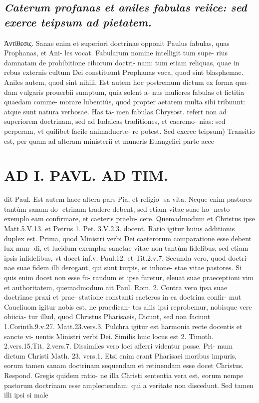 \documentclass{article}
\begin{document}
\begin{pages}
\subsection*{\textit{Caterum profanas et aniles fabulas reiice: sed exerce teipsum ad pietatem. }}\pstart Ἀντίθεσις. Sanae enim et superiori doctrinae opponit Paulus fabulas, quas Prophanas, et Ani- les vocat. Fabularum nomine intelligit tum supe- rius damnatam de prohibitione ciborum doctri- nam: tum etiam reliquas, quae in rebus externis cultum Dei constituunt Prophanas voca, quod sint blasphemae. Aniles autem, quod sint nihili. Est autem hoc postremum dictum ex forma qua- dam vulgaris prouerbii sumptum, quia solent a- nus mulieres fabulas et fictitia quaedam comme- morare lubentiùs, quod propter aetatem multa sibi tribuunt: atque sunt natura verbosae. Has ta- men fabulas Chrysost. refert non ad superiorem doctrinam, sed ad Iudaicas traditiones, et caeremo- nias: sed perperam, vt quilibet facile animaduerte- re potest.  \pend\pstart Sed exerce teipsum) Transitio est, per quam ad alteram ministerii et muneris Euangelici parte acce  \pend
\section*{AD I. PAVL. AD TIM. }
\marginpar{[ p.204 ]}\pstart dit Paul. Est autem haec altera pars Pia, et religio- sa vita. Neque enim pastores tantùm sanam do- ctrinam tradere debent, sed etiam vitae suae ho- nesto exemplo eam confirmare, et caeteris praelu- cere. Quemadmodum et Christus ipse Matt.5.V.13. et Petrus 1. Pet. 3.V.2.3. docent. Ratio igitur huius additionis duplex est. Prima, quod Ministri verbi Dei caeterorum comparatione esse debent lux mun- di, et lucidum exemplar sanctae vitae non tantùm fidelibus, sed etiam ipsis infidelibus, vt docet inf.v. Paul.12. et Tit.2.v.7. Secunda vero, quod doctri- nae suae fidem illi derogant, qui sunt turpis, et inhone- stae vitae pastores. Si quis enim docet non esse fu- randum et ipse furetur, eleuat suae praeceptioni vim et authoritatem, quemadmodum ait Paul. Rom. 2. Contra vero ipsa suae doctrinae praxi et prae- statione constanti caeteros in ea doctrina confir- mut Caueliuom igitur nobis est, ne praedican- tes aliis ipsi reprobemur, nobisque vere obiicia- tur illud, quod Christus Pharisaeis, Dicunt, sed non faciunt 1.Corinth.9.v.27. Matt.23.vers.3. Pulchra igitur est harmonia recte docentis et sancte vi- uentis Ministri verbi Dei.  \pend\pstart Similis huic locus est 2. Timoth. 2.vers.15.Tit. 2.vers.7.  \pend\pstart Dissimiles vero loci afferri videntur posse. Pri- mum dictum Christi Math. 23. vers.1. Etsi enim erant Pharisaei moribus impuris, eorum tamen sanam doctrinam sequendam et retinendam esse docet Christus. Respond. Gregis quidem ratio- ne illa Christi sententia vera est, eorum nempe pastorum doctrinam esse amplectendam: qui a veritate non discedunt. Sed tamen illi ipsi si male  \pend

\end{pages}
\end{document}
